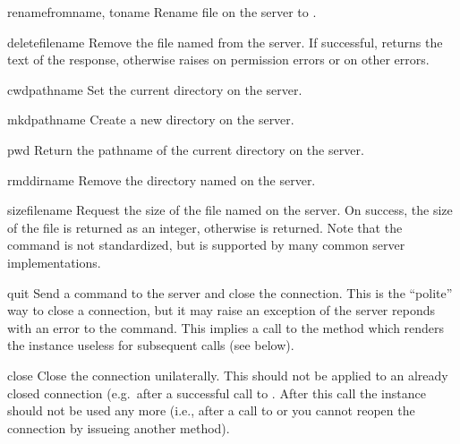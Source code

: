 \begin{methoddesc}{rename}{fromname, toname}
Rename file  on the server to .
\end{methoddesc}

\begin{methoddesc}{delete}{filename}
Remove the file named  from the server.  If successful,
returns the text of the response, otherwise raises
 on permission errors or  
on other errors.
\end{methoddesc}

\begin{methoddesc}{cwd}{pathname}
Set the current directory on the server.
\end{methoddesc}

\begin{methoddesc}{mkd}{pathname}
Create a new directory on the server.
\end{methoddesc}

\begin{methoddesc}{pwd}{}
Return the pathname of the current directory on the server.
\end{methoddesc}

\begin{methoddesc}{rmd}{dirname}
Remove the directory named  on the server.
\end{methoddesc}

\begin{methoddesc}{size}{filename}
Request the size of the file named  on the server.  On
success, the size of the file is returned as an integer, otherwise
 is returned.  Note that the  command is not 
standardized, but is supported by many common server implementations.
\end{methoddesc}

\begin{methoddesc}{quit}{}
Send a  command to the server and close the connection.
This is the ``polite'' way to close a connection, but it may raise an
exception of the server reponds with an error to the 
command.  This implies a call to the  method which
renders the  instance useless for subsequent calls (see
below).
\end{methoddesc}

\begin{methoddesc}{close}{}
Close the connection unilaterally.  This should not be applied to an
already closed connection (e.g.\ after a successful call to
.  After this call the  instance should not
be used any more (i.e., after a call to  or
 you cannot reopen the connection by issueing another
 method).
\end{methoddesc}
